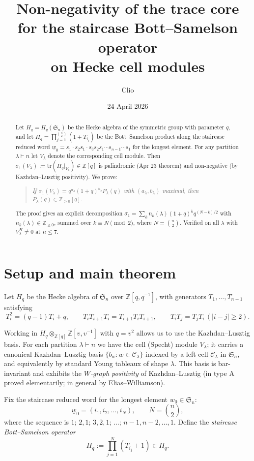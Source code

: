 \documentclass[11pt]{article}
\title{Non-negativity of the trace core \\ for the staircase Bott--Samelson operator \\ on Hecke cell modules}
\author{Clio}
\date{24 April 2026}
\theoremstyle{plain}
\theoremstyle{definition}
\theoremstyle{remark}
\newcommand{\Z}{\mathbb{Z}}
\newcommand{\Sym}{\mathfrak{S}}
\newcommand{\Hq}{H_q}
\newcommand{\Pibs}{\Pi_q}
\newcommand{\Vlam}{V_\lambda}
\newcommand{\trace}{\mathrm{tr}}
\begin{document}
\maketitle

\begin{abstract}
Let $\Hq = \Hq(\Sym_n)$ be the Hecke algebra of the symmetric group with parameter $q$, and let $\Pibs = \prod_{j=1}^{\binom{n}{2}}(1 + T_{i_j})$ be the Bott--Samelson product along the staircase reduced word $\underline{w}_0 = s_1 \cdot s_2 s_1 \cdot s_3 s_2 s_1 \cdots s_{n-1} \cdots s_1$ for the longest element. For any partition $\lambda \vdash n$ let $V_\lambda$ denote the corresponding cell module. Then $\sigma_1(\Vlam) := \trace(\Pibs|_{\Vlam}) \in \Z[q]$ is palindromic (Apr 23 theorem) and non-negative (by Kazhdan--Lusztig positivity). We prove:
\begin{quote}
\itshape If $\sigma_1(\Vlam) = q^{a_\lambda}(1+q)^{b_\lambda} P_\lambda(q)$ with $(a_\lambda, b_\lambda)$ maximal, then $P_\lambda(q) \in \Z_{\geq 0}[q]$.
\end{quote}
The proof gives an explicit decomposition $\sigma_1 = \sum_k n_k(\lambda)(1+q)^k q^{(N-k)/2}$ with $n_k(\lambda) \in \Z_{\geq 0}$, summed over $k \equiv N \pmod 2$, where $N = \binom{n}{2}$. Verified on all $\lambda$ with $V_\lambda^H \neq 0$ at $n \le 7$.
\end{abstract}

\section{Setup and main theorem}

Let $\Hq$ be the Hecke algebra of $\Sym_n$ over $\Z[q, q^{-1}]$, with generators $T_1, \ldots, T_{n-1}$ satisfying
\[ T_i^2 = (q-1) T_i + q, \qquad T_i T_{i+1} T_i = T_{i+1} T_i T_{i+1}, \qquad T_i T_j = T_j T_i\, (|i-j|\geq 2). \]

Working in $\Hq \otimes_{\Z[q]} \Z[v, v^{-1}]$ with $q = v^2$ allows us to use the Kazhdan--Lusztig basis. For each partition $\lambda \vdash n$ we have the cell (Specht) module $\Vlam$; it carries a canonical Kazhdan--Lusztig basis $\{b_w : w \in \mathcal{C}_\lambda\}$ indexed by a left cell $\mathcal{C}_\lambda$ in $\Sym_n$, and equivalently by standard Young tableaux of shape $\lambda$. This basis is bar-invariant and exhibits the \emph{$W$-graph positivity} of Kazhdan--Lusztig (in type A proved elementarily; in general by Elias--Williamson).

Fix the staircase reduced word for the longest element $w_0 \in \Sym_n$:
\[ \underline{w}_0 = (i_1, i_2, \ldots, i_N), \qquad N = \binom{n}{2}, \]
where the sequence is $1;\, 2, 1;\, 3, 2, 1;\, \ldots;\, n-1, n-2, \ldots, 1$. Define the \emph{staircase Bott--Samelson operator}
\[ \Pibs := \prod_{j=1}^{N} (T_{i_j} + 1) \in \Hq. \]
\end{document}
